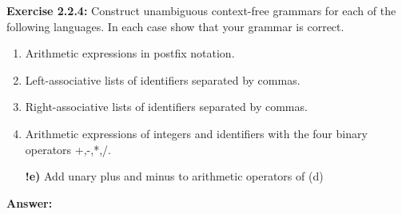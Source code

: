 \documentclass{article}
\begin{document}
\newpage
\textbf{Exercise 2.2.4:} Construct unambiguous context-free grammars for each of the following languages. In each case show that your grammar is correct.
\begin{enumerate}[label=\textbf{\alph*)}]
	\item Arithmetic expressions in postfix notation.
	\item Left-associative lists of identifiers separated by commas.
	\item Right-associative lists of identifiers separated by commas.
	\item Arithmetic expressions of integers and identifiers with the four binary operators +,-,*,/.
	\item[\textbf{!e)}] Add unary plus and minus to arithmetic operators of (d)
\end{enumerate}
\textbf{Answer:}
\end{document}
